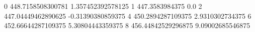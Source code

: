 0 448.7158508300781 1.357452392578125
1 447.3583984375 0.0
2 447.04449462890625 -0.31390380859375
4 450.2894287109375 2.9310302734375
6 452.66644287109375 5.30804443359375
8 456.44842529296875 9.09002685546875
